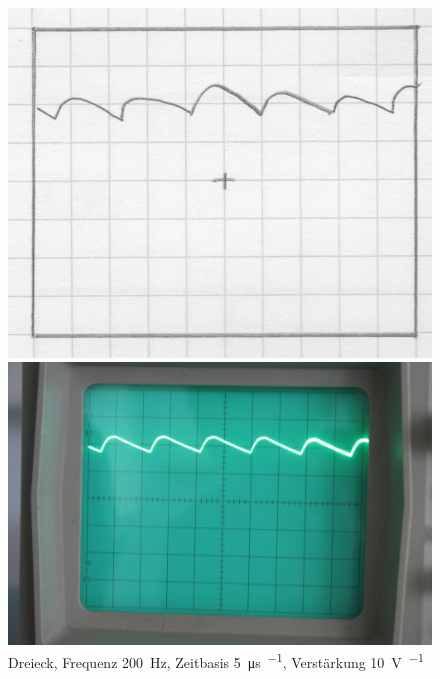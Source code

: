 \begin{figure}[htbp]
	\centering
	\begin{minipage}{.45\linewidth}
	\includegraphics[width=\linewidth]{Oszi_Hand/797.jpg}
	\end{minipage}
	\hfill
	\begin{minipage}{.45\linewidth}
	\includegraphics[width=\linewidth]{Oszi_Foto/797.jpg}
	\end{minipage}
	\caption{%
		Dreieck, Frequenz \SI{200}{\hertz},
		Zeitbasis \SI{5}{\micro\second\per\division},
		Verstärkung \SI{10}{\volt\per\division}
	}
	\label{fig:797}
\end{figure}

